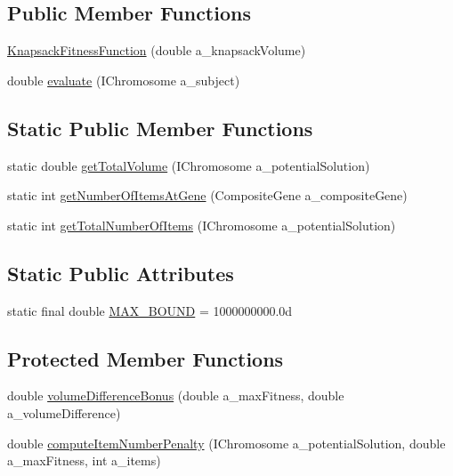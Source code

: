 \subsection*{Public Member Functions}
\begin{DoxyCompactItemize}
\item 
\hyperlink{classexamples_1_1multidimension_1_1_knapsack_fitness_function_a44b68374809c293ed53cdc9c1383222e}{Knapsack\-Fitness\-Function} (double a\-\_\-knapsack\-Volume)
\item 
double \hyperlink{classexamples_1_1multidimension_1_1_knapsack_fitness_function_a8d77659c07f4f15348a6cdc37c2eab99}{evaluate} (I\-Chromosome a\-\_\-subject)
\end{DoxyCompactItemize}
\subsection*{Static Public Member Functions}
\begin{DoxyCompactItemize}
\item 
static double \hyperlink{classexamples_1_1multidimension_1_1_knapsack_fitness_function_a84ed0b4fd5a23d410ea9e2f79397f07b}{get\-Total\-Volume} (I\-Chromosome a\-\_\-potential\-Solution)
\item 
static int \hyperlink{classexamples_1_1multidimension_1_1_knapsack_fitness_function_a2d1c3e2c8dc74c39fd050fafaba3f629}{get\-Number\-Of\-Items\-At\-Gene} (Composite\-Gene a\-\_\-composite\-Gene)
\item 
static int \hyperlink{classexamples_1_1multidimension_1_1_knapsack_fitness_function_a1bcb8705d8677dab836d77216cfc0e28}{get\-Total\-Number\-Of\-Items} (I\-Chromosome a\-\_\-potential\-Solution)
\end{DoxyCompactItemize}
\subsection*{Static Public Attributes}
\begin{DoxyCompactItemize}
\item 
static final double \hyperlink{classexamples_1_1multidimension_1_1_knapsack_fitness_function_ac0c7b5ff45d180a1cebbf7c78391d5ac}{M\-A\-X\-\_\-\-B\-O\-U\-N\-D} = 1000000000.\-0d
\end{DoxyCompactItemize}
\subsection*{Protected Member Functions}
\begin{DoxyCompactItemize}
\item 
double \hyperlink{classexamples_1_1multidimension_1_1_knapsack_fitness_function_ad8afdead74c7edcacbf7fda1a492db36}{volume\-Difference\-Bonus} (double a\-\_\-max\-Fitness, double a\-\_\-volume\-Difference)
\item 
double \hyperlink{classexamples_1_1multidimension_1_1_knapsack_fitness_function_a0b3ded8e957df88f5f8d61fcdc7c073a}{compute\-Item\-Number\-Penalty} (I\-Chromosome a\-\_\-potential\-Solution, double a\-\_\-max\-Fitness, int a\-\_\-items)
\end{DoxyCompactItemize}
